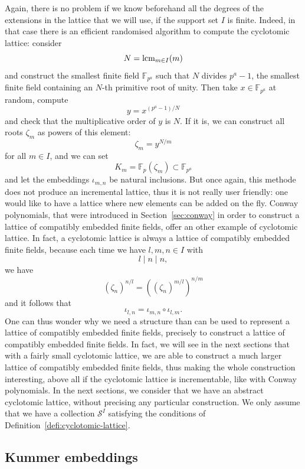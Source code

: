 Again, there is no problem if we know beforehand all the degrees of the
extensions in the lattice that we will use, \ie if the support set $I$ is
finite. Indeed, in that case there is an efficient randomised algorithm to
compute the cyclotomic lattice: consider
\[
  N = \operatorname{lcm}_{m\in I}(m)
\]
and construct the smallest finite field $\mathbb{F}_{p^a}$ such that $N$ divides
$p^a-1$, \ie the smallest finite field containing an $N$-th primitive root of
unity. Then take $x\in\mathbb{F}_{p^a}$ at random, compute 
\[
  y=x^{(p^a-1)/N}
\]
and check that the multiplicative order of $y$ is $N$. If it is, we can
construct all roots $\zeta_m$ as powers of this element:
\[
  \zeta_m = y^{N/m}
\]
for all $m\in I$, and we can set
\[
  K_m = \mathbb{F}_p(\zeta_m)\subset \mathbb{F}_{p^a}
\]
and let the embeddings $\iota_{m, n}$ be natural inclusions. But once again,
this methode does not produce an incremental lattice, thus it is not really user
friendly: one would like to have a lattice where new elements can be added on
the fly. Conway polynomials, that were introduced in
Section~\ref{sec:conway} in order to construct a lattice of
compatibly embedded finite fields, offer an other example of cyclotomic lattice. In
fact, a cyclotomic lattice is always a lattice of compatibly embedded finite
fields, because each time we have $l, m, n\in I$ with
\[
  l\mid n\mid n,
\]
we have
\[
  (\zeta_n)^{n/l} = ((\zeta_n)^{m/l})^{n/m}
\]
and it follows that
\[
  \iota_{l, n} = \iota_{m, n}\circ\iota_{l, m}.
\]
One can thus wonder why we need a structure than can be used to represent a
lattice of compatibly embedded finite fields, precisely to construct a lattice
of compatibly embedded finite fields. In fact, we will see in the next sections
that with a fairly small cyclotomic lattice, we are able to construct a much larger
lattice of compatibly embedded finite fields, thus making the whole construction
interesting, above all if the cyclotomic lattice is incrementable, like with
Conway polynomials. In the next sections, we consider that we have an abstract
cyclotomic lattice, without precising any particular construction. We only
assume that we have a collection $\mathcal S^I$ satisfying the conditions of
Definition~\ref{defi:cyclotomic-lattice}.

\subsection{Kummer embeddings}
\label{sec:kummer-embeddings}

